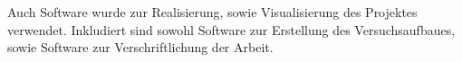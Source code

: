 Auch Software wurde zur Realisierung, sowie Visualisierung des Projektes verwendet.
Inkludiert sind sowohl Software zur Erstellung des Versuchsaufbaues, sowie Software zur Verschriftlichung der Arbeit.